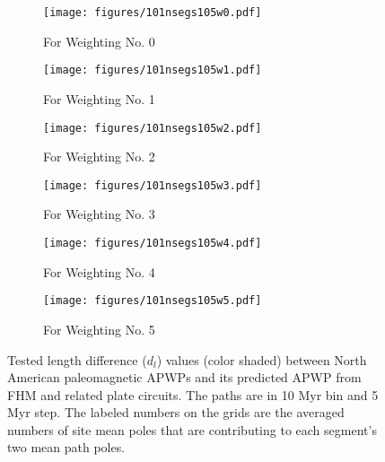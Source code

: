 \begin{figure*}
	\centering
	\begin{subfigure}{.495\textwidth}
		\texttt{[image: figures/101nsegs105w0.pdf]}
		\caption{For Weighting No. 0}\label{fig-na-dlw0}
	\end{subfigure}
	\vspace{.1em}
	\begin{subfigure}{.495\textwidth}
		\texttt{[image: figures/101nsegs105w1.pdf]}
		\caption{For Weighting No. 1}\label{fig-na-dlw1}
	\end{subfigure}
	\vspace{.1em}
	\begin{subfigure}{.495\textwidth}
		\texttt{[image: figures/101nsegs105w2.pdf]}
		\caption{For Weighting No. 2}\label{fig-na-dlw2}
	\end{subfigure}
	\vspace{.1em}
	\begin{subfigure}{.495\textwidth}
		\texttt{[image: figures/101nsegs105w3.pdf]}
		\caption{For Weighting No. 3}\label{fig-na-dlw3}
	\end{subfigure}
	\vspace{.1em}
	\begin{subfigure}{.495\textwidth}
		\texttt{[image: figures/101nsegs105w4.pdf]}
		\caption{For Weighting No. 4}\label{fig-na-dlw4}
	\end{subfigure}
	\vspace{.1em}
	\begin{subfigure}{.495\textwidth}
		\texttt{[image: figures/101nsegs105w5.pdf]}
		\caption{For Weighting No. 5}\label{fig-na-dlw5}
	\end{subfigure}
	\caption[dl of each pair of segments for North American 10/5 Myr
APWPs]{Tested length difference ($d_l$) values (color shaded) between North
American paleomagnetic APWPs and its predicted APWP from FHM and related plate
circuits. The paths are in 10 Myr bin and 5 Myr step. The labeled numbers on the
grids are the averaged numbers of site mean poles that are contributing to each
segment's two mean path poles.}\label{fig-nadl}
\end{figure*}

